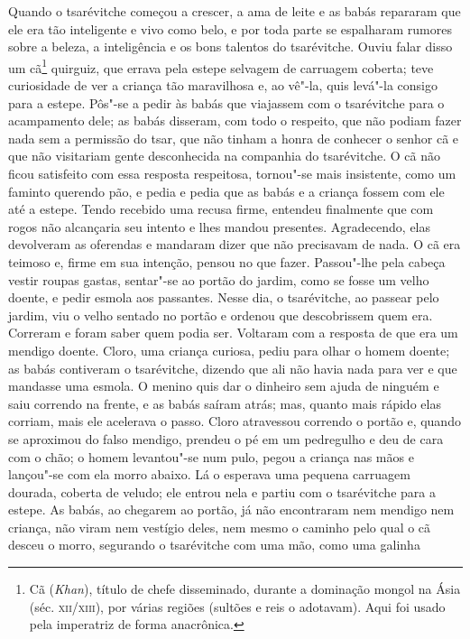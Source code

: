Quando o tsarévitche começou a crescer, a ama de leite e as babás
repararam que ele era tão inteligente e vivo como belo, e por toda parte
se espalharam rumores sobre a beleza, a inteligência e os bons talentos
do tsarévitche. Ouviu falar disso um cã\footnote{Cã (\emph{Khan}),
  título de chefe disseminado, durante a dominação mongol na Ásia (séc.
  \textsc{xii/xiii}), por várias regiões (sultões e reis o adotavam). Aqui foi
  usado pela imperatriz de forma anacrônica.} quirguiz, que errava
pela estepe selvagem de carruagem coberta; teve curiosidade de ver a
criança tão maravilhosa e, ao vê"-la, quis levá"-la consigo para a estepe.
Pôs"-se a pedir às babás que viajassem com o tsarévitche para o acampamento
dele; as babás disseram, com todo o respeito, que não podiam fazer nada
sem a permissão do tsar, que não tinham a honra de conhecer o senhor cã
e que não visitariam gente desconhecida na companhia do tsarévitche. O
cã não ficou satisfeito com essa resposta respeitosa, tornou"-se mais
insistente, como um faminto querendo pão, e pedia e pedia que as babás e
a criança fossem com ele até a estepe. Tendo recebido uma recusa firme,
entendeu finalmente que com rogos não alcançaria seu intento e lhes
mandou presentes. Agradecendo, elas devolveram as oferendas e mandaram
dizer que não precisavam de nada. O cã era teimoso e, firme em sua
intenção, pensou no que fazer. Passou"-lhe pela cabeça vestir roupas
gastas, sentar"-se ao portão do jardim, como se fosse um velho doente, e
pedir esmola aos passantes. Nesse dia, o tsarévitche, ao passear pelo
jardim, viu o velho sentado no portão e ordenou que descobrissem quem
era. Correram e foram saber quem podia ser. Voltaram com a resposta de
que era um mendigo doente. Cloro, uma criança curiosa, pediu para olhar
o homem doente; as babás contiveram o tsarévitche, dizendo que ali não
havia nada para ver e que mandasse uma esmola. O menino quis dar o
dinheiro sem ajuda de ninguém e saiu correndo na frente, e as babás
saíram atrás; mas, quanto mais rápido elas corriam, mais ele acelerava o
passo. Cloro atravessou correndo o portão e, quando se aproximou do
falso mendigo, prendeu o pé em um pedregulho e deu de cara com o chão; o
homem levantou"-se num pulo, pegou a criança nas mãos e lançou"-se com ela
morro abaixo. Lá o esperava uma pequena carruagem dourada, coberta de
veludo; ele entrou nela e partiu com o tsarévitche para a estepe. As
babás, ao chegarem ao portão, já não encontraram nem mendigo nem
criança, não viram nem vestígio deles, nem mesmo o caminho pelo qual o
cã desceu o morro, segurando o tsarévitche com uma mão, como uma galinha

